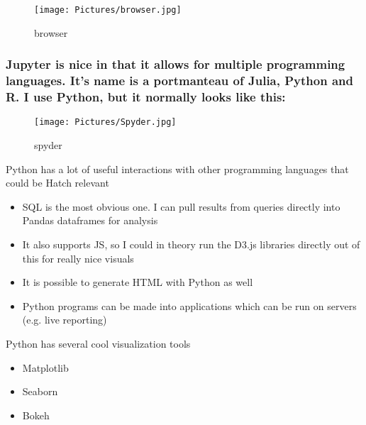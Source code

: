 \documentclass[11pt]{article}
\makeatletter
\def\maxwidth{\ifdim\Gin@nat@width>\linewidth\linewidth
    \else\Gin@nat@width\fi}
\let\Oldincludegraphics\includegraphics
\renewcommand{\includegraphics}[1]{\Oldincludegraphics[width=.8\maxwidth]{#1}}
\providecommand{\tightlist}{%
      \setlength{\itemsep}{0pt}\setlength{\parskip}{0pt}}
\makeatother
\begin{document}
\begin{figure}
\centering
\texttt{[image: Pictures/browser.jpg]}
\caption{browser}
\end{figure}

    \subsubsection{Jupyter is nice in that it allows for multiple
programming languages. It's name is a portmanteau of Julia, Python and
R. I use Python, but it normally looks like
this:}\label{jupyter-is-nice-in-that-it-allows-for-multiple-programming-languages.-its-name-is-a-portmanteau-of-julia-python-and-r.-i-use-python-but-it-normally-looks-like-this}

\begin{figure}
\centering
\texttt{[image: Pictures/Spyder.jpg]}
\caption{spyder}
\end{figure}

    Python has a lot of useful interactions with other programming languages
that could be Hatch relevant

\begin{itemize}
\tightlist
\item
  SQL is the most obvious one. I can pull results from queries directly
  into Pandas dataframes for analysis
\item
  It also supports JS, so I could in theory run the D3.js libraries
  directly out of this for really nice visuals
\item
  It is possible to generate HTML with Python as well
\item
  Python programs can be made into applications which can be run on
  servers (e.g. live reporting)
\end{itemize}

    Python has several cool visualization tools

\begin{itemize}
\tightlist
\item
  Matplotlib
\item
  Seaborn
\item
  Bokeh
\end{itemize}
\end{document}
